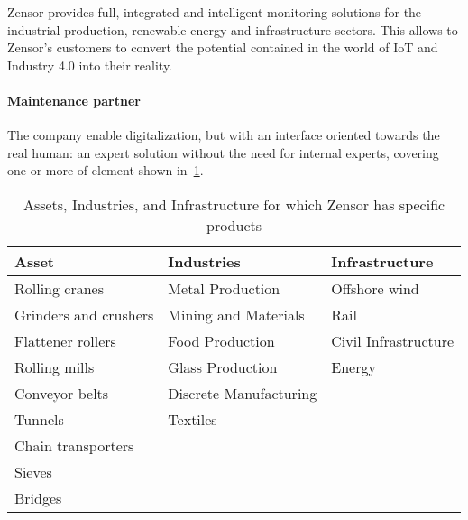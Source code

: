 Zensor \cite{Misc:zensor_official_website} provides full, integrated and intelligent monitoring solutions for the industrial production, renewable energy and infrastructure sectors.
This allows to Zensor's customers to convert the potential contained in the world of \ac{IoT} and Industry 4.0 into their reality. 

\paragraph{Maintenance partner}
The company enable digitalization, but with an interface oriented towards the real human: an expert solution without the need for internal experts, covering one or more of element shown in~\ref{tab:assets_zensors}.
\begin{table}[h]
    \begin{tabular}{@{}lll@{}}
    \toprule
    Asset                 & Industries                       & Infrastructure                       \\ \midrule
    Rolling cranes        & Metal Production                 & Offshore wind                        \\
    Grinders and crushers & Mining and Materials             & Rail                                 \\
    Flattener rollers     & Food Production                  & Civil Infrastructure                 \\
    Rolling mills         & Glass Production                 & Energy                               \\
    Conveyor belts        & Discrete Manufacturing                                                  \\
    Tunnels               & Textiles                                                                \\
    Chain transporters    &                                                                         \\
    Sieves                &                                                                         \\
    Bridges               &                                                                         \\ \bottomrule
\end{tabular}
\caption{Assets, Industries, and Infrastructure for which Zensor has specific products}
\label{tab:assets_zensors}
\end{table}

